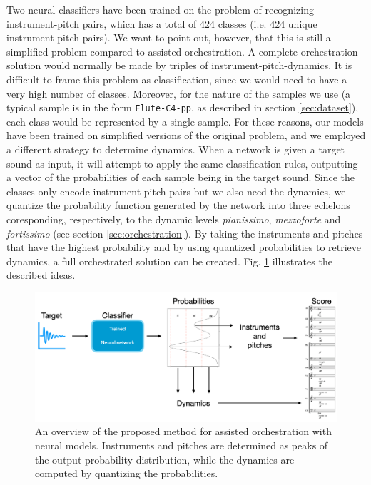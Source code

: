 \documentclass[runningheads,a4paper]{llncs}
\begin{document}
Two neural classifiers have been trained on the problem of recognizing instrument-pitch pairs, which has a total of 424 classes (i.e. 424 unique instrument-pitch pairs). We want to point out, however, that this is still a simplified problem compared to assisted orchestration. A complete orchestration solution would normally be made by triples of instrument-pitch-dynamics. It is difficult to frame this problem as classification, since we would need to have a very high number of classes. Moreover, for the nature of the samples we use (a typical sample is in the form \texttt{Flute-C4-pp}, as described in section \ref{sec:dataset}), each class would be represented by a single sample. For these reasons, our models have been trained on simplified versions of the original problem, and we employed a different strategy to determine dynamics. When a network is given a target sound as input, it will attempt to apply the same classification rules, outputting a vector of the probabilities of each sample being in the target sound. Since the classes only encode instrument-pitch pairs but we also need the dynamics, we quantize the probability function generated by the network into three echelons coresponding, respectively, to the dynamic levels \emph{pianissimo}, \emph{mezzoforte} and \emph{fortissimo} (see section \ref{sec:orchestration}). By taking the instruments and pitches that have the highest probability and by using quantized probabilities to retrieve dynamics, a full orchestrated solution can be created.  Fig. \ref{fig:method} illustrates the described ideas.

\begin{figure}
	\centering
	\includegraphics[scale=0.20]{../ISMIR_2020/figs/method.png}
	\caption{An overview of the proposed method for assisted orchestration with neural models. Instruments and pitches are determined as peaks of the output probability distribution, while the dynamics are computed by quantizing the probabilities. \label{fig:method}}
\end{figure}
\end{document}
